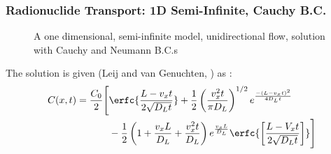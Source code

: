 \begin{frame}
  \frametitle{Radionuclide Transport: 1D Semi-Infinite, Cauchy B.C.}
  \footnotesize{
\begin{figure}[htbp!]
  \begin{center}
    \def\svgwidth{.5\textwidth}
    
  \end{center}
  \caption{A one dimensional, semi-infinite model, unidirectional flow,
  solution with Cauchy and Neumann B.C.s}
  \label{fig:1dinf}
\end{figure}
The solution is given (Leij and van Genuchten, \cite{leij_analytical_1991})  as :
\begin{align}
  C(x,t) = \frac{C_0}{2}\Bigg[&\erfc{\frac{L-v_xt}{2\sqrt{D_Lt}}} 
  + \frac{1}{2} \left(\frac{v_x^2t}{\pi D_L}\right)^{1/2}e^{\frac{-( L - 
  v_xt)^2}{4D_Lt}}\nonumber\\
  &- \frac{1}{2}\left( 
  1+\frac{v_xL}{D_L}+\frac{v_x^2t}{D_L}\right)e^\frac{v_xL}{D_L}\erfc{\left[\frac{L-V_xt}{2\sqrt{D_Lt}}\right]} 
  \Bigg]
  \end{align}
  }
\end{frame}

